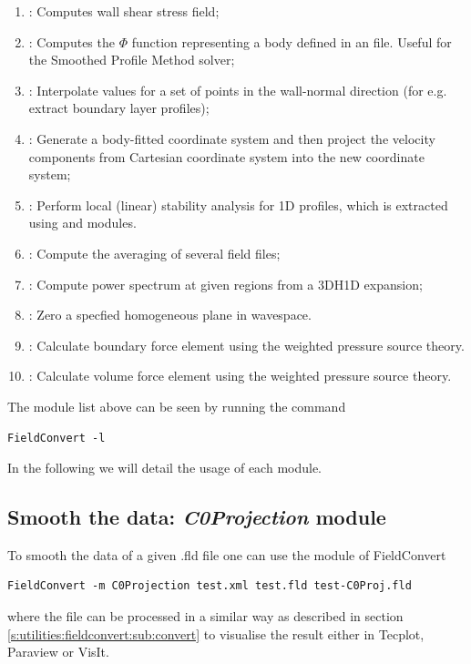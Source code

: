 \begin{enumerate}
\item {}: Computes wall shear stress field;
\item {}: Computes the $\Phi$ function representing a body defined
  in an  file. Useful for the Smoothed Profile Method solver;
\item {}: Interpolate values for a set of points in the wall-normal direction (for e.g. extract boundary layer profiles);
\item {}: Generate a body-fitted coordinate system and then  project the velocity components from Cartesian coordinate system into the new coordinate system;
\item {}: Perform local (linear) stability analysis for 1D profiles, which is extracted using  and  modules.
\item {}: Compute the averaging of several field files;
\item {}: Compute power spectrum at given regions from a 3DH1D expansion;
\item {}: Zero a specfied homogeneous plane in wavespace.
\item {}: Calculate boundary force element using the weighted pressure source theory.
\item {}: Calculate volume force element using the weighted pressure source theory.
\end{enumerate}
The module list above can be seen by running the command
%
\begin{lstlisting}[style=BashInputStyle]
FieldConvert -l
\end{lstlisting}
%
In the following we will detail the usage of each module.
%
%
%

\subsection{Smooth the data: \textit{C0Projection} module}
To smooth the data of a given .fld file one can
use the  module of FieldConvert
%
\begin{lstlisting}[style=BashInputStyle]
FieldConvert -m C0Projection test.xml test.fld test-C0Proj.fld
\end{lstlisting}
%
where the file  can be processed in a similar
way as described in section \ref{s:utilities:fieldconvert:sub:convert}
to visualise the result either in Tecplot, Paraview or VisIt.

